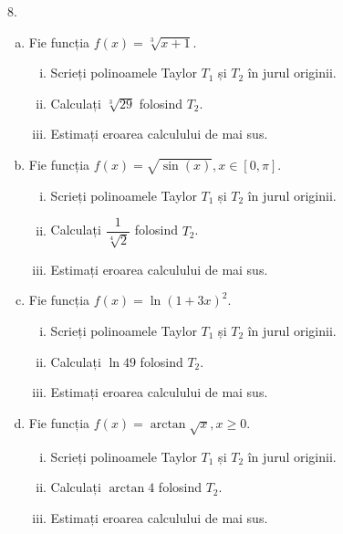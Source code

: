 8. \begin{enumerate}[(a)]
    \item Fie funcția $ f(x) = \sqrt[3]{x + 1} $.
        \begin{enumerate}[(i)]
            \item Scrieți polinoamele Taylor $ T_1 $ și $ T_2 $ în jurul
                originii.
            \item Calculați $ \sqrt[3]{29} $ folosind $ T_2 $.
            \item Estimați eroarea calculului de mai sus.
        \end{enumerate}
    \item Fie funcția $ f(x) = \sqrt{\sin(x)}, x \in [0, \pi] $. 
        \begin{enumerate}[(i)]
            \item Scrieți polinoamele Taylor $ T_1 $ și $ T_2 $ în jurul
                originii.
            \item Calculați $ \dfrac{1}{\sqrt[4]{2}} $ folosind $ T_2 $.
            \item Estimați eroarea calculului de mai sus.
        \end{enumerate}
    \item Fie funcția $ f(x) = \ln(1 + 3x)^2 $.
        \begin{enumerate}[(i)]
            \item Scrieți polinoamele Taylor $ T_1 $ și $ T_2 $ în jurul originii.
            \item Calculați $ \ln 49 $ folosind $ T_2 $.
            \item Estimați eroarea calculului de mai sus.
        \end{enumerate}
    \item Fie funcția $ f(x) = \arctan \sqrt{x}, x \geq 0 $.
        \begin{enumerate}[(i)]
            \item Scrieți polinoamele Taylor $ T_1 $ și $ T_2 $ în jurul originii.
            \item Calculați $ \arctan 4 $ folosind $ T_2 $.
            \item Estimați eroarea calculului de mai sus.
        \end{enumerate}
\end{enumerate}


